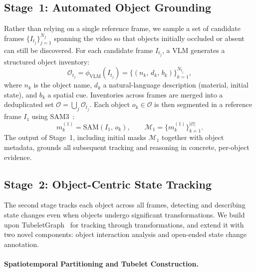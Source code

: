 \documentclass[runningheads]{llncs}
\begin{document}
\subsection{Stage~1: Automated Object Grounding}
\label{sec:stage1}


Rather than relying on a single reference frame, we sample a set of candidate frames $\{I_{t_j}\}_{j=1}^{N_f}$ spanning the video so that objects initially occluded or absent can still be discovered.
For each candidate frame $I_{t_j}$, a VLM generates a structured object inventory:
%
\begin{equation}
  \mathcal{O}_{t_j}
  = \phi_{\mathrm{VLM}}(I_{t_j})
  = \bigl\{(n_k,\, d_k,\, b_k)\bigr\}_{k=1}^{N_{t_j}},
  \label{eq:vlm_inventory}
\end{equation}
%
where $n_k$ is the object name, $d_k$ a natural-language description (material, initial state), and $b_k$ a spatial cue.
Inventories across frames are merged into a deduplicated set $\mathcal{O}=\bigcup_j \mathcal{O}_{t_j}$.
Each object $o_k\!\in\!\mathcal{O}$ is then segmented in a reference frame $I_1$ using SAM3~\cite{carion2025sam}:
%
\begin{equation}
  m_k^{(1)} = \mathrm{SAM}(I_1,\, o_k),
  \qquad
  \mathcal{M}_1 = \bigl\{m_k^{(1)}\bigr\}_{k=1}^{|\mathcal{O}|}.
  \label{eq:sam_masks}
\end{equation}
%
The output of Stage~1, including initial masks $\mathcal{M}_1$ together with object metadata, grounds all subsequent tracking and reasoning in concrete, per-object evidence.






\subsection{Stage~2: Object-Centric State Tracking}
\label{sec:stage2}

The second stage tracks each object across all frames, detecting and describing state changes even when objects undergo significant transformations. We build upon TubeletGraph~\cite{sun2025tracking} for tracking through transformations, and extend it with two novel components: object interaction analysis  and open-ended state change annotation.



\paragraph{\textbf{Spatiotemporal Partitioning and Tubelet Construction}.}
\end{document}
